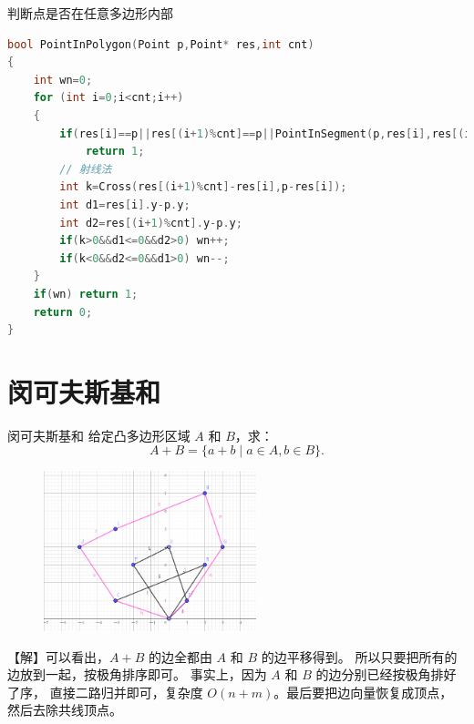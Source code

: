 \documentclass{beamer}
\begin{document}
\begin{frame}[fragile]{判断点是否在任意多边形内部}
    \small
    \begin{lstlisting}[language=c++]
bool PointInPolygon(Point p,Point* res,int cnt)
{
    int wn=0;
    for (int i=0;i<cnt;i++)
    {
        if(res[i]==p||res[(i+1)%cnt]==p||PointInSegment(p,res[i],res[(i+1)%cnt]))
            return 1;
        // 射线法
        int k=Cross(res[(i+1)%cnt]-res[i],p-res[i]);
        int d1=res[i].y-p.y;
        int d2=res[(i+1)%cnt].y-p.y;
        if(k>0&&d1<=0&&d2>0) wn++;
        if(k<0&&d2<=0&&d1>0) wn--;
    }
    if(wn) return 1;
    return 0;
}
    \end{lstlisting}
\end{frame}

\section{闵可夫斯基和}

\begin{frame}{闵可夫斯基和}
    \footnotesize
    给定凸多边形区域 $A$ 和 $B$，求：
    \begin{equation*}
        A+B=\{a+b \;|\; a\in A,b\in B\}.
    \end{equation*}

    \begin{figure}[H]
        \centering
        \includegraphics[width=0.55\textwidth]{pic/minkovski.png}
    \end{figure}

    \pause
    【解】可以看出，$A+B$ 的边全都由 $A$ 和 $B$ 的边平移得到。
    所以只要把所有的边放到一起，按极角排序即可。
    事实上，因为 $A$ 和 $B$ 的边分别已经按极角排好了序，
    直接二路归并即可，复杂度 $O(n+m)$。最后要把边向量恢复成顶点，
    然后去除共线顶点。
\end{frame}
\end{document}
